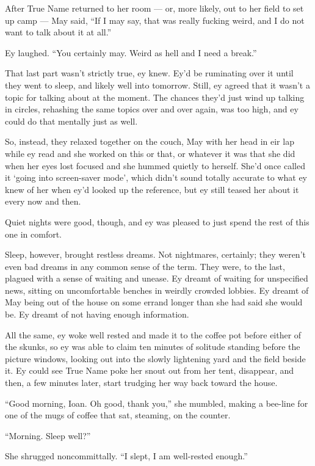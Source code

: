 After True Name returned to her room — or, more likely, out to her field to set up camp — May said, ``If I may say, that was really fucking weird, and I do not want to talk about it at all.''

Ey laughed. ``You certainly may. Weird as hell and I need a break.''

That last part wasn't strictly true, ey knew. Ey'd be ruminating over it until they went to sleep, and likely well into tomorrow. Still, ey agreed that it wasn't a topic for talking about at the moment. The chances they'd just wind up talking in circles, rehashing the same topics over and over again, was too high, and ey could do that mentally just as well.

So, instead, they relaxed together on the couch, May with her head in eir lap while ey read and she worked on this or that, or whatever it was that she did when her eyes lost focused and she hummed quietly to herself. She'd once called it `going into screen-saver mode', which didn't sound totally accurate to what ey knew of her when ey'd looked up the reference, but ey still teased her about it every now and then.

Quiet nights were good, though, and ey was pleased to just spend the rest of this one in comfort.

Sleep, however, brought restless dreams. Not nightmares, certainly; they weren't even bad dreams in any common sense of the term. They were, to the last, plagued with a sense of waiting and unease. Ey dreamt of waiting for unspecified news, sitting on uncomfortable benches in weirdly crowded lobbies. Ey dreamt of May being out of the house on some errand longer than she had said she would be. Ey dreamt of not having enough information.

All the same, ey woke well rested and made it to the coffee pot before either of the skunks, so ey was able to claim ten minutes of solitude standing before the picture windows, looking out into the slowly lightening yard and the field beside it. Ey could see True Name poke her snout out from her tent, disappear, and then, a few minutes later, start trudging her way back toward the house.

``Good morning, Ioan. Oh good, thank you,'' she mumbled, making a bee-line for one of the mugs of coffee that sat, steaming, on the counter.

``Morning. Sleep well?''

She shrugged noncommittally. ``I slept, I am well-rested enough.''

